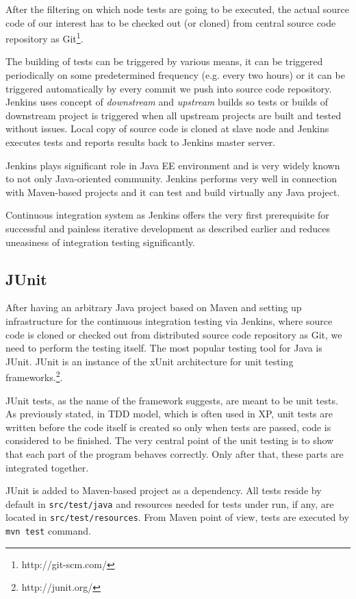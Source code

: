 \documentclass[12pt,final,oneside]{fithesis}
\begin{document}
After the filtering on which node tests are going to be executed, the actual source code of our interest has to be checked out (or cloned) from central source code repository as Git\footnote{http://git-scm.com/}.

The building of tests can be triggered by various means, it can be triggered periodically on some predetermined frequency (e.g. every two hours) or it can be triggered automatically by every commit we push into source code repository. Jenkins uses concept of \textit{downstream} and \textit{upstream}\cite{bib042} builds so tests or builds of downstream project is triggered when all upstream projects are built and tested without issues. Local copy of source code is cloned at slave node and Jenkins executes tests and reports results back to Jenkins master server.

Jenkins plays significant role in Java EE environment and is very widely known to not only Java-oriented community\cite{bib043}. Jenkins performs very well in connection with Maven-based projects and it can test and build virtually any Java project.

Continuous integration system as Jenkins offers the very first prerequisite for successful and painless iterative development as described earlier and reduces uneasiness of integration testing significantly.

		\subsection{JUnit}\label{junit-subsection}
		
After having an arbitrary Java project based on Maven and setting up infrastructure for the continuous integration testing via Jenkins, where source code is cloned or checked out from distributed source code repository as Git, we need to perform the testing itself. The most popular testing tool for Java is JUnit\cite{bib050}. JUnit is an instance of the xUnit architecture for unit testing frameworks.\footnote{http://junit.org/}.

JUnit tests, as the name of the framework suggests, are meant to be unit tests. As previously stated, in TDD model, which is often used in XP, unit tests are written before the code itself is created so only when tests are passed, code is considered to be finished. The very central point of the unit testing is to show that each part of the program behaves correctly. Only after that, these parts are integrated together.

JUnit is added to Maven-based project as a dependency. All tests reside by default in \texttt{src/test/java} and resources needed for tests under run, if any, are located in \texttt{src/test/resources}. From Maven point of view, tests are executed by \texttt{mvn test} command.
\end{document}

